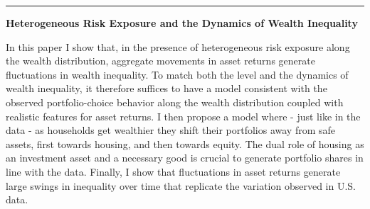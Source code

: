 \documentclass{resume} %
\renewenvironment{abstract}{\begin{adjustwidth}{1em}{}}{\end{adjustwidth}}
\newcommand\cinzel[1]{{\scfamily #1}}
\renewenvironment{rSection}[1]{
\sectionskip
{\color{accent_dark}\textsb{\cinzel{\Large{\textsc{#1}}}}}
\normalsize
\sectionlineskip
{\color{accent_dark}\vspace{-2.5pt}\hrule height 1.5pt}
\begin{list}{}{
\setlength{\leftmargin}{1.5em}
}
\item[]
}{
\end{list}
}
\begin{document}
\begin{rSection}{Job Market Paper}

{\sc \textbf{Heterogeneous Risk Exposure and the Dynamics of Wealth Inequality}} \\[-1.5em]
{\begin{abstract}
    \footnotesize 
    In this paper I show that, in the presence of heterogeneous risk exposure along the wealth distribution, aggregate movements in asset returns generate fluctuations in wealth inequality.
    To match both the level and the dynamics of wealth inequality, it therefore suffices to have a model consistent with the observed portfolio-choice behavior along the wealth distribution coupled with realistic features for asset returns.
    I then propose a model where - just like in the data - as households get wealthier they shift their portfolios away from safe assets, first towards housing, and then towards equity.
    The dual role of housing as an investment asset and a necessary good is crucial to generate portfolio shares in line with the data.
    Finally, I show that fluctuations in asset returns generate large swings in inequality over time that replicate the variation observed in U.S. data.
\end{abstract}}
\vspace*{0.5em}

\end{rSection}\vspace*{-1.5ex}

\end{document}
